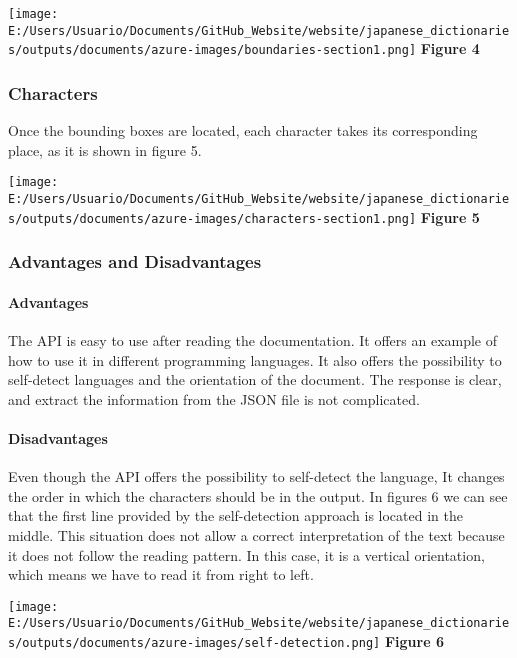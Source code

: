 \documentclass[
]{article}
\begin{document}
\texttt{[image: E:/Users/Usuario/Documents/GitHub\_Website/website/japanese\_dictionaries/outputs/documents/azure-images/boundaries-section1.png]}
\textbf{Figure 4}

\hypertarget{characters}{%
\subsubsection{Characters}\label{characters}}

Once the bounding boxes are located, each character takes its
corresponding place, as it is shown in figure 5.

\texttt{[image: E:/Users/Usuario/Documents/GitHub\_Website/website/japanese\_dictionaries/outputs/documents/azure-images/characters-section1.png]}
\textbf{Figure 5}

\hypertarget{advantages-and-disadvantages}{%
\subsubsection{Advantages and
Disadvantages}\label{advantages-and-disadvantages}}

\hypertarget{advantages}{%
\paragraph{Advantages}\label{advantages}}

The API is easy to use after reading the documentation. It offers an
example of how to use it in different programming languages. It also
offers the possibility to self-detect languages and the orientation of
the document. The response is clear, and extract the information from
the JSON file is not complicated.

\hypertarget{disadvantages}{%
\paragraph{Disadvantages}\label{disadvantages}}

Even though the API offers the possibility to self-detect the language,
It changes the order in which the characters should be in the output. In
figures 6 we can see that the first line provided by the self-detection
approach is located in the middle. This situation does not allow a
correct interpretation of the text because it does not follow the
reading pattern. In this case, it is a vertical orientation, which means
we have to read it from right to left.

\texttt{[image: E:/Users/Usuario/Documents/GitHub\_Website/website/japanese\_dictionaries/outputs/documents/azure-images/self-detection.png]}
\textbf{Figure 6}
\end{document}
